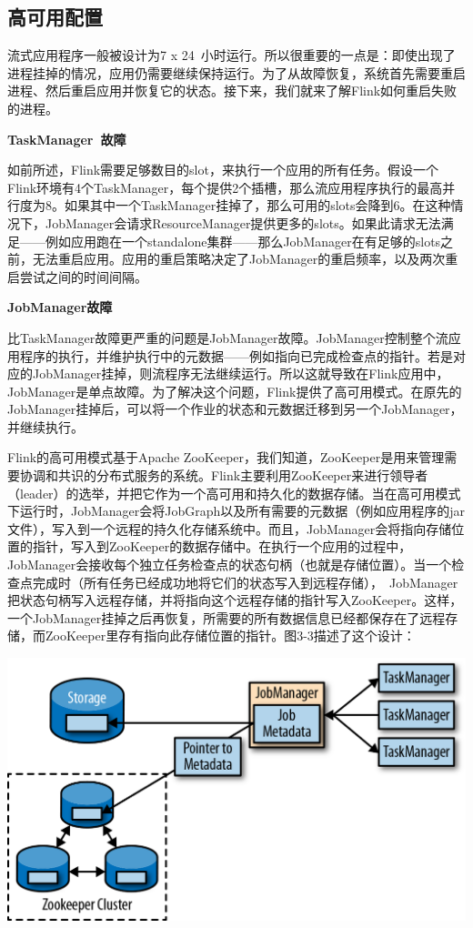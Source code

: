 \documentclass[oneside]{ctexbook}
\begin{document}
\subsection{高可用配置}

流式应用程序一般被设计为7 x 24 小时运行。所以很重要的一点是：即使出现了进程挂掉的情况，应用仍需要继续保持运行。为了从故障恢复，系统首先需要重启进程、然后重启应用并恢复它的状态。接下来，我们就来了解Flink如何重启失败的进程。

\textbf{TaskManager 故障}

如前所述，Flink需要足够数目的slot，来执行一个应用的所有任务。假设一个Flink环境有4个TaskManager，每个提供2个插槽，那么流应用程序执行的最高并行度为8。如果其中一个TaskManager挂掉了，那么可用的slots会降到6。在这种情况下，JobManager会请求ResourceManager提供更多的slots。如果此请求无法满足——例如应用跑在一个standalone集群——那么JobManager在有足够的slots之前，无法重启应用。应用的重启策略决定了JobManager的重启频率，以及两次重启尝试之间的时间间隔。

\textbf{JobManager故障}

比TaskManager故障更严重的问题是JobManager故障。JobManager控制整个流应用程序的执行，并维护执行中的元数据——例如指向已完成检查点的指针。若是对应的JobManager挂掉，则流程序无法继续运行。所以这就导致在Flink应用中，JobManager是单点故障。为了解决这个问题，Flink提供了高可用模式。在原先的JobManager挂掉后，可以将一个作业的状态和元数据迁移到另一个JobManager，并继续执行。

Flink的高可用模式基于Apache ZooKeeper，我们知道，ZooKeeper是用来管理需要协调和共识的分布式服务的系统。Flink主要利用ZooKeeper来进行领导者（leader）的选举，并把它作为一个高可用和持久化的数据存储。当在高可用模式下运行时，JobManager会将JobGraph以及所有需要的元数据（例如应用程序的jar文件），写入到一个远程的持久化存储系统中。而且，JobManager会将指向存储位置的指针，写入到ZooKeeper的数据存储中。在执行一个应用的过程中，JobManager会接收每个独立任务检查点的状态句柄（也就是存储位置）。当一个检查点完成时（所有任务已经成功地将它们的状态写入到远程存储）， JobManager把状态句柄写入远程存储，并将指向这个远程存储的指针写入ZooKeeper。这样，一个JobManager挂掉之后再恢复，所需要的所有数据信息已经都保存在了远程存储，而ZooKeeper里存有指向此存储位置的指针。图3-3描述了这个设计：

\noindent \includegraphics[width=\textwidth]{spaf_0303.png}
\end{document}
